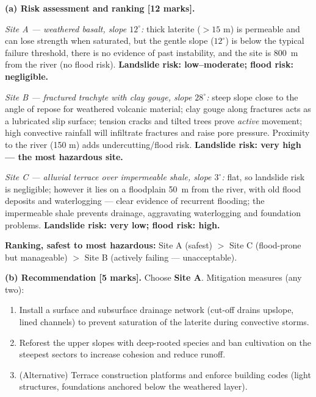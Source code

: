 \documentclass[11pt]{article}
\begin{document}
\begin{corrige}
\textbf{(a) Risk assessment and ranking [12 marks].}

\emph{Site A — weathered basalt, slope $12^\circ$:} thick laterite ($>15$ m) is permeable and can lose strength when saturated, but the gentle slope ($12^\circ$) is below the typical failure threshold, there is no evidence of past instability, and the site is \SI{800}{m} from the river (no flood risk). \textbf{Landslide risk: low–moderate; flood risk: negligible.}

\emph{Site B — fractured trachyte with clay gouge, slope $28^\circ$:} steep slope close to the angle of repose for weathered volcanic material; clay gouge along fractures acts as a lubricated slip surface; tension cracks and tilted trees prove \emph{active} movement; high convective rainfall will infiltrate fractures and raise pore pressure. Proximity to the river (150 m) adds undercutting/flood risk. \textbf{Landslide risk: very high — the most hazardous site.}

\emph{Site C — alluvial terrace over impermeable shale, slope $3^\circ$:} flat, so landslide risk is negligible; however it lies on a floodplain \SI{50}{m} from the river, with old flood deposits and waterlogging — clear evidence of recurrent flooding; the impermeable shale prevents drainage, aggravating waterlogging and foundation problems. \textbf{Landslide risk: very low; flood risk: high.}

\textbf{Ranking, safest to most hazardous:} Site A (safest) $>$ Site C (flood-prone but manageable) $>$ Site B (actively failing — unacceptable).

\textbf{(b) Recommendation [5 marks].} Choose \textbf{Site A}. Mitigation measures (any two):
\begin{enumerate}
\item Install a surface and subsurface drainage network (cut-off drains upslope, lined channels) to prevent saturation of the laterite during convective storms.
\item Reforest the upper slopes with deep-rooted species and ban cultivation on the steepest sectors to increase cohesion and reduce runoff.
\item (Alternative) Terrace construction platforms and enforce building codes (light structures, foundations anchored below the weathered layer).
\end{enumerate}


\end{corrige}
\end{document}

